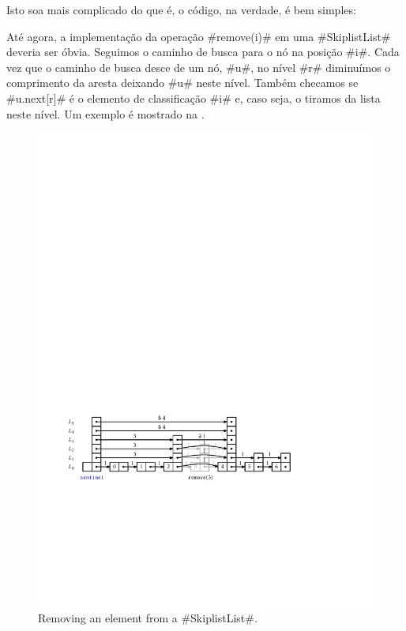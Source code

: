 Isto soa mais complicado do que é, o código, na verdade, 
é bem simples:



Até agora, a implementação da 
operação #remove(i)# em uma #SkiplistList# deveria ser óbvia.  Seguimos o caminho de busca para o nó na posição #i#. Cada vez que o caminho de busca desce de um nó, #u#, no nível #r# diminuímos o comprimento da aresta deixando #u# neste nível.  Também checamos se #u.next[r]# é o elemento de classificação #i# e, caso seja, o tiramos da lista neste nível. Um exemplo é mostrado na .
\begin{figure}
	\begin{center}
		\includegraphics[width=\ScaleIfNeeded]{figs/skiplist-removei}
	\end{center}
	\caption[Removing an element from a SkiplistList]{Removing an element from a #SkiplistList#.}
\end{figure}

